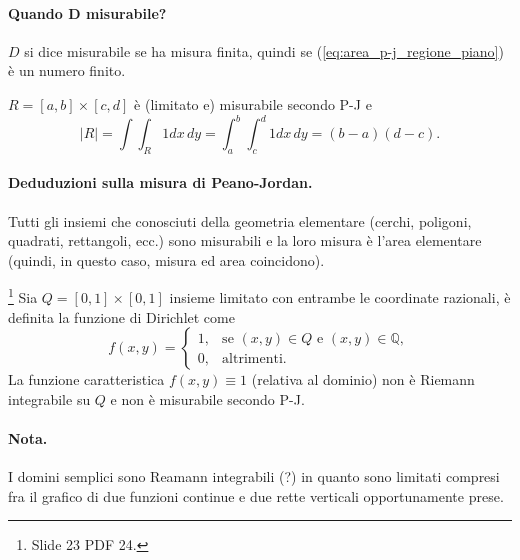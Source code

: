 \paragraph{Quando $\boldsymbol{D}$ misurabile?} $D$ si dice misurabile se ha misura finita, quindi se (\ref{eq:area_p-j_regione_piano}) è un numero finito.

\begin{example}
	$R= [a,b]\times [c,d]$ è (limitato e) misurabile secondo P-J e 
	\begin{equation*}
		|R| =\int \int_R 1 dx\, dy = \int_a^b\int_c^d 1 dx\, dy = (b-a) (d-c).
	\end{equation*}
\end{example}

\paragraph{Deduduzioni sulla misura di Peano-Jordan.} Tutti gli insiemi che conosciuti della geometria elementare (cerchi, poligoni, quadrati, rettangoli, ecc.) sono misurabili e la loro misura è l'area elementare (quindi, in questo caso, misura ed area coincidono).

\begin{example}
	\footnote{Slide 23 PDF 24.} Sia $Q = [0,1]\times[0,1]$ insieme limitato con entrambe le coordinate razionali, è definita la funzione di Dirichlet come
	\begin{equation*}
		f(x,y) =
		\begin{cases}
			1, &\text{se } (x,y)\in Q \text{ e } (x,y)\in\mathbb{Q},\\
			0, &\text{altrimenti}.
		\end{cases}
	\end{equation*}
	La funzione caratteristica $f(x,y) \equiv 1$ (relativa al dominio) non è Riemann integrabile su $Q$ e non è misurabile secondo P-J.
\end{example}

\paragraph{Nota.} I domini semplici sono Reamann integrabili (?) in quanto sono limitati compresi fra il grafico di due funzioni continue e due rette verticali opportunamente prese.

